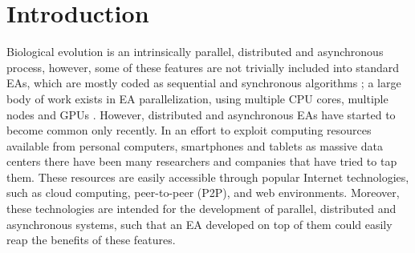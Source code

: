 \documentclass{llncs}
\begin{document}
\begin{abstract}

\end{abstract}
\section{Introduction}

Biological evolution is an intrinsically parallel, distributed and asynchronous process, however, 
some of these features are not trivially included into standard EAs,  which are mostly coded as sequential 
and synchronous algorithms \cite{eiben};  a large body of work exists in EA parallelization, 
using multiple CPU cores, multiple nodes and GPUs \cite{cantu2000efficient}.
However, distributed and asynchronous EAs have started to become common only recently. In an effort to
exploit computing resources available from personal computers,
smartphones and tablets as massive data centers there have been many
researchers and companies that have tried to tap them. 
These resources are easily accessible through popular Internet technologies, such as cloud computing, 
peer-to-peer (P2P), and web environments. Moreover, these technologies are intended for the development 
of parallel, distributed and asynchronous systems, such that an EA developed on top of them could easily 
reap the benefits of these features.
\end{document}
